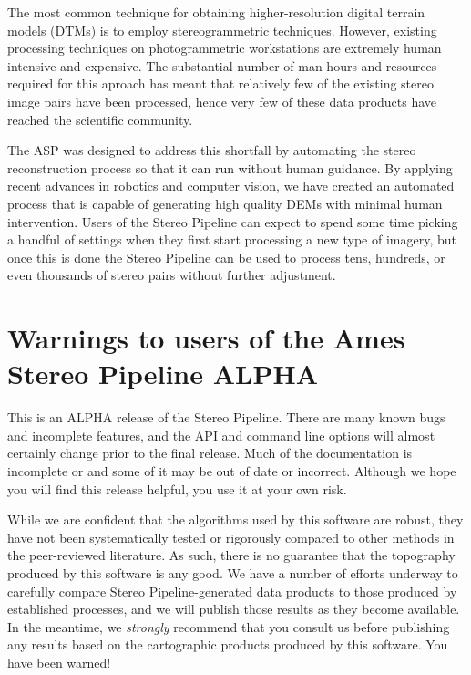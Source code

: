 The most common technique for obtaining higher-resolution digital
terrain models (DTMs) is to employ stereogrammetric techniques.
However, existing processing techniques on photogrammetric
workstations are extremely human intensive and expensive.  The
substantial number of man-hours and resources required for this
aproach has meant that relatively few of the existing stereo image
pairs have been processed, hence very few of these data products have
reached the scientiﬁc community.

The ASP was designed to address this shortfall by automating the
stereo reconstruction process so that it can run without human
guidance.  By applying recent advances in robotics and computer
vision, we have created an automated process that is capable of
generating high quality DEMs with minimal human intervention.  Users
of the Stereo Pipeline can expect to spend some time picking a handful
of settings when they first start processing a new type of imagery,
but once this is done the Stereo Pipeline can be used to process tens,
hundreds, or even thousands of stereo pairs without further
adjustment.

\section{Warnings to users of the Ames Stereo Pipeline ALPHA}

This is an ALPHA release of the Stereo Pipeline.  There are many known
bugs and incomplete features, and the API and command line options
will almost certainly change prior to the final release.  Much of the
documentation is incomplete or and some of it may be out of date or
incorrect.  Although we hope you will find this release helpful, you
use it at your own risk.

While we are confident that the algorithms used by this software are
robust, they have not been systematically tested or rigorously
compared to other methods in the peer-reviewed literature.  As such,
there is no guarantee that the topography produced by this software is
any good.  We have a number of efforts underway to carefully compare
Stereo Pipeline-generated data products to those produced by
established processes, and we will publish those results as they
become available.  In the meantime, we {\em strongly} recommend that
you consult us before publishing any results based on the cartographic
products produced by this software. You have been warned!



